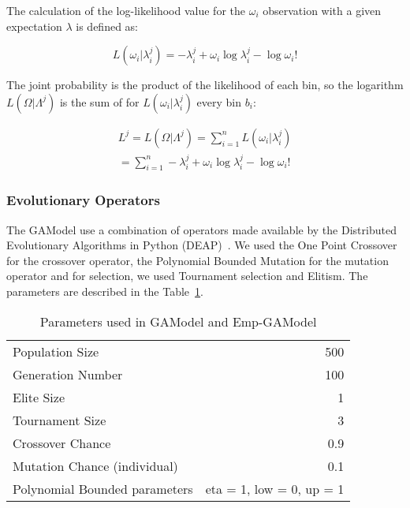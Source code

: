 The calculation of the log-likelihood value for the $\omega_i$
observation with a given expectation $\lambda$ is defined as:


\begin{equation}
L(\omega_i|\lambda_i^j) = -\lambda_i^j + \omega_i\log\lambda_i^j - \log\omega_i!
\end{equation}

The joint probability is the product of the likelihood of each bin, so the logarithm $L(\Omega|\Lambda^j)$ is the sum of for
$L(\omega_i|\lambda_i^j)$ every bin $b_i$:

\begin{equation}\label{log-like}
\begin{split}
L^j = L(\Omega|\Lambda^j) = \sum_{i=1}^{n}L(\omega_i|\lambda_i^j)  \\
= \sum_{i=1}^{n} -\lambda_i^j + \omega_i\log\lambda_i^j - \log\omega_i!  
\end{split}
\end{equation}


\subsubsection{Evolutionary Operators}\label{gaOperators}
The GAModel use a combination of operators made available by the Distributed Evolutionary Algorithms in Python (DEAP)~\cite{DeRainville}. We used the One Point Crossover for the crossover operator, the Polynomial Bounded Mutation for the mutation operator and for selection, we used Tournament selection and Elitism. The parameters are described in the Table~\ref{GAParameters5.1}.

\begin{table}[H]
	\caption{Parameters used in GAModel and Emp-GAModel}
	\label{GAParameters5.1}
	\begin{center}
		\begin{tabular}{|l|r|}
			\hline
			Population Size & 500\\
			Generation Number & 100\\
			Elite Size & 1\\
			Tournament Size & 3\\
			Crossover Chance & 0.9\\
			Mutation Chance (individual) & 0.1\\
			Polynomial Bounded parameters & eta = 1, low = 0, up = 1\\
			\hline    
		\end{tabular}
	\end{center}
\end{table}

